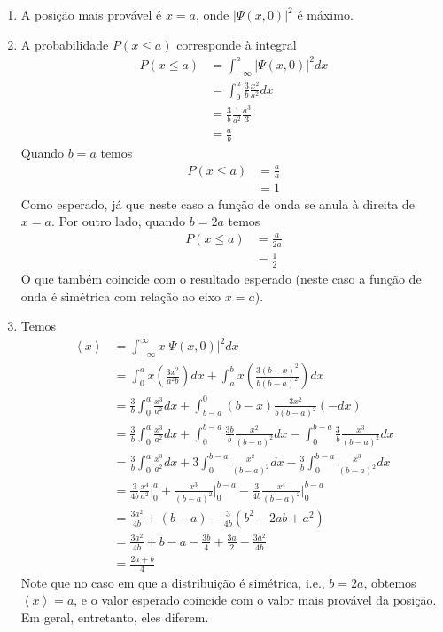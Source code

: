 \documentclass[a4paper, 12pt, notitlepage]{article}
\begin{document}
\begin{enumerate}
\begin{enumerate}
\begin{figure}[!h]
  \end{figure}
  \item A posição mais provável é $x=a$, onde $|\Psi(x,0)|^2$ é máximo.
  \item A probabilidade $P(x \le a)$ corresponde à integral
  \begin{align*}
  P(x \le a) &= \int_{-\infty}^a |\Psi(x,0)|^2 dx \\
  &= \int_0^a \frac{3}{b} \frac{x^2}{a^2} dx \\
  &= \frac{3}{b}\frac{1}{a^2} \frac{a^3}{3} \\
  &= \frac{a}{b}
  \end{align*}
  Quando $b = a$ temos
  \begin{align*}
  P(x \le a) &= \frac{a}{a} \\
  &= 1
  \end{align*}
  Como esperado, já que neste caso a função de onda se anula à direita de $x=a$. Por outro lado, quando $b = 2a$ temos
  \begin{align*}
  P(x \le a) &= \frac{a}{2a} \\
  &= \frac{1}{2}
  \end{align*}
  O que também coincide com o resultado esperado (neste caso a função de onda é simétrica com relação ao eixo $x=a$).
  \item Temos
  \begin{align*}
  \left\langle x \right\rangle &= \int_{-\infty}^{\infty} x |\Psi(x, 0)|^2 dx \\
  &= \int_0^a x \left(\frac{3x^2}{a^2b}\right) dx + \int_a^b x \left(\frac{3(b-x)^2}{b(b-a)^2}\right)dx \\
  &= \frac{3}{b}\int_0^a \frac{x^3}{a^2} dx + \int_{b-a}^0 \left(b - x \right)\frac{3x^2}{b(b-a)^2}(-dx) \\
  &= \frac{3}{b}\int_0^a \frac{x^3}{a^2} dx + \int_0^{b-a} \frac{3b}{b}\frac{x^2}{(b-a)^2}dx - \int_0^{b-a} \frac{3}{b} \frac{x^3}{(b-a)^2} dx \\
  &= \frac{3}{b}\int_0^a \frac{x^3}{a^2} dx  + 3\int_0^{b-a}\frac{x^2}{(b-a)^2} dx - \frac{3}{b}\int_0^{b-a}\frac{x^3}{(b-a)^2} dx \\
  &= \frac{3}{4b} \frac{x^4}{a^2}\Big|_0^a + \frac{x^3}{(b-a)^2}\Big|_0^{b-a} - \frac{3}{4b}\frac{x^4}{(b-a)^2}\Big|_0^{b-a} \\
  &= \frac{3a^2}{4b} + (b - a) - \frac{3}{4b}\left(b^2 - 2ab + a^2\right) \\
  &= \frac{3a^2}{4b} + b - a - \frac{3b}{4} + \frac{3a}{2} -\frac{3a^2}{4b} \\
  &= \frac{2a + b}{4}
  \end{align*}
  Note que no caso em que a distribuição é simétrica, i.e., $b = 2a$, obtemos $\left\langle x \right\rangle = a$, e o valor esperado coincide com o valor mais provável da posição. Em geral, entretanto, eles diferem.
  \end{enumerate}
 

\end{enumerate}
\end{document}
